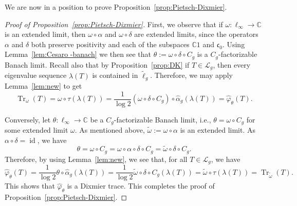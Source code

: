 \documentclass[10pt, a4paper]{amsart}
\newcommand{\C}{\mathbb{C}}
\newcommand{\sL}{\mathscr{L}}
\newcommand{\co}{\mathfrak{c}_{0}}
\newcommand{\op}{\operatorname}
\newcommand{\Tr}{\op{Tr}}
\newcommand{\Trw}{\Tr_{\omega}}
\numberwithin{equation}{section}
\theoremstyle{definition}
\theoremstyle{remark}
\begin{document}
We are now in a position to prove Proposition~\ref{prop:Pietsch-Dixmier}.

\begin{proof}[Proof of Proposition~\ref{prop:Pietsch-Dixmier}]
 First, we observe that if $\omega:\ell_\infty\rightarrow \C$ is an extended limit, then $\omega\circ \alpha$ and $\omega\circ \delta$ are extended limits, since the operators $\alpha$ and $\delta$ both preserve positivity and each of the subspaces $\C1$ and $\co$. Using Lemma~\ref{lem:Cesaro -banach} we then see that $\theta:=\omega\circ \delta \circ C_g$ is a $C_g$-factorizable Banach limit. Recall also that by Proposition~\ref{prop:DK} if $T\in \sL_g$, then every eigenvalue sequence $\lambda(T)$ is contained in $\tilde{\ell}_g$. Therefore, we may apply Lemma~\ref{lem:new} to get
  \begin{equation*}
 \Trw(T)=\omega \circ \tau \left(\lambda(T)\right)= \frac{1}{\log 2}(\omega\circ \delta\circ C_g) \circ \hat{\alpha}_g \left(\lambda(T)\right)= \hat{\varphi}_\theta(T).
\end{equation*}

Conversely, let $\theta:\ell_\infty \rightarrow \C$ be a $C_g$-factorizable Banach limit, i.e., $\theta=\omega\circ C_g$ for some extended limit $\omega$. As mentioned above, $\tilde{\omega}:=\omega\circ \alpha$ is an extended limit. As $\alpha\circ \delta=\op{id}$, we have
\begin{equation*}
 \theta=\omega\circ C_g=\omega\circ \alpha \circ \delta \circ C_g=\tilde{\omega}\circ \delta \circ C_g.
\end{equation*}
Therefore, by using Lemma~\ref{lem:new}, we see that, for all $T\in \sL_g$, we have
\begin{equation*}
\hat{\varphi}_\theta (T)= \frac{1}{\log 2} \theta \circ \hat{\alpha}_g\left(\lambda(T)\right)=
 \frac{1}{\log 2} \tilde{\omega}\circ \delta \circ C_g\left(\lambda(T)\right)= \tilde{\omega}\circ \tau \left(\lambda(T)\right)= \Tr_{\tilde{\omega}}(T).
\end{equation*}
This shows that $\hat{\varphi}_\theta$ is a Dixmier trace. This completes the proof of Proposition~\ref{prop:Pietsch-Dixmier}.
\end{proof}
\end{document}
